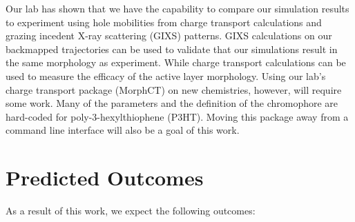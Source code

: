 Our lab has shown that we have the capability to compare our simulation results to experiment using hole mobilities from charge transport calculations\cite{Jones2017,Miller2018a} and grazing incedent X-ray scattering (GIXS) patterns\cite{Miller2018}.
GIXS calculations on our backmapped trajectories can be used to validate that our simulations result in the same morphology as experiment.
While charge transport calculations can be used to measure the efficacy of the active layer morphology.
Using our lab's charge transport package (MorphCT) on new chemistries, however, will require some work.
Many of the parameters and the definition of the chromophore are hard-coded for poly-3-hexylthiophene (P3HT).
Moving this package away from a command line interface will also be a goal of this work.


\section*{Predicted Outcomes}

As a result of this work, we expect the following outcomes:

